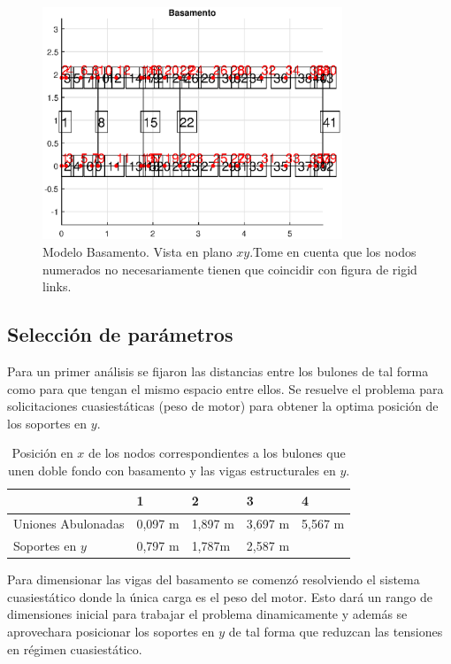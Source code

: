 \documentclass[onecolumn,10pt,titlepage,a4paper]{article}
\begin{document}
\begin{figure}[htb!]
	\centering
	\includegraphics[width=0.8\textwidth]{fig/modelbasamento.eps}
	\caption{Modelo Basamento. Vista en plano $x\!y$.Tome en cuenta que los nodos numerados no necesariamente tienen que coincidir con figura de rigid links.}
	\label{fig:modelobasamento}
\end{figure}

\subsection*{Selección de parámetros}
Para un primer análisis se fijaron las distancias entre los bulones de tal forma como para que tengan el mismo espacio entre ellos. Se resuelve el problema para solicitaciones cuasiestáticas (peso de motor) para obtener la optima posición de los soportes en $y$.


\begin{table}[htb!]
	\centering
	\begin{tabular}{lllll}
		& 1 & 2 & 3 & 4 \\ \hline
		Uniones Abulonadas& 0,097 \si{\meter}  & 1,897 \si{ \meter} & 3,697 \si{ \meter} & 5,567 \si{ \meter} \\
		Soportes en $y$& 0,797 \si{\meter}  &1,787\si{\meter}   & 2,587 \si{\meter}  &  \\
	\end{tabular}
\caption{Posición en $x$ de los nodos correspondientes a los bulones que unen doble fondo con basamento y las vigas estructurales en $y$.}
\end{table}

Para dimensionar las vigas del basamento se comenzó resolviendo el sistema cuasiestático donde la única carga es el peso del motor. Esto dará un rango de dimensiones inicial para trabajar el problema dinamicamente y además se aprovechara posicionar los soportes en $y$ de tal forma que reduzcan las tensiones en régimen cuasiestático. 
\end{document}
